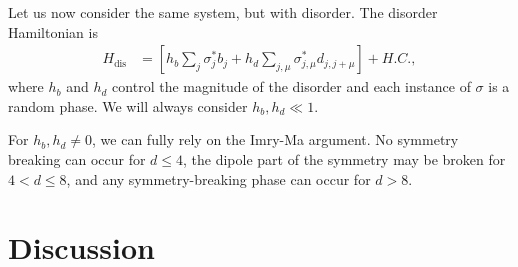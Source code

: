 \documentclass[pra,aps,twocolumn, amsfonts,amsmath,amssymb,nofootinbib,superscriptaddress]{revtex4-2}
\providecommand{\DIFdelbegin}{} %
\providecommand{\DIFdelend}{} %
\newcommand{\DIFscaledelfig}{0.5}
\newlength{\DIFdelgraphicswidth} %
\newlength{\DIFdelgraphicsheight} %
\newcommand{\DIFdelincludegraphics}[2][]{%
\sbox{\DIFdelgraphicsbox}{\DIFOincludegraphics[#1]{#2}}%
\settoboxwidth{\DIFdelgraphicswidth}{\DIFdelgraphicsbox} %
\settoboxtotalheight{\DIFdelgraphicsheight}{\DIFdelgraphicsbox} %
\scalebox{\DIFscaledelfig}{%
\parbox[b]{\DIFdelgraphicswidth}{\usebox{\DIFdelgraphicsbox}\\[-\baselineskip] \rule{\DIFdelgraphicswidth}{0em}}\llap{\resizebox{\DIFdelgraphicswidth}{\DIFdelgraphicsheight}{%
\setlength{\unitlength}{\DIFdelgraphicswidth}%
\begin{picture}(1,1)%
\thicklines\linethickness{2pt} %
{\color[rgb]{1,0,0}\put(0,0){\framebox(1,1){}}}%
{\color[rgb]{1,0,0}\put(0,0){\line( 1,1){1}}}%
{\color[rgb]{1,0,0}\put(0,1){\line(1,-1){1}}}%
\end{picture}%
}\hspace*{3pt}}} %
} %
\DeclareRobustCommand{\DIFdelbegin}{\DIFOdelbegin \let\includegraphics\DIFdelincludegraphics} %
\DeclareRobustCommand{\DIFdelend}{\DIFOaddend \let\includegraphics\DIFOincludegraphics} %
\begin{document}
\DIFdelend Let us now consider the same system, but with disorder.  The disorder Hamiltonian is
\begin{align}
H_\text{dis} &= \left[h_b\sum_j \sigma^*_jb_j + h_d \sum_{j,\mu} \sigma^*_{j,\mu}d_{j,j+\mu}\right] + H.C.,
\end{align}
where $h_b$ and $h_d$ control the magnitude of the disorder and each instance of $\sigma$ is a random phase. We will always consider $h_b,h_d\ll1$.

\DIFdelbegin %


\DIFdelend For $h_b,h_d\ne 0$, we can fully rely on the Imry-Ma argument. No symmetry breaking can occur for $d\le 4$, the dipole part of the symmetry may be broken for $4<d\le 8$, and any symmetry-breaking phase can occur for $d>8$. 

\section{Discussion} \label{sec:disc}
\end{document}
